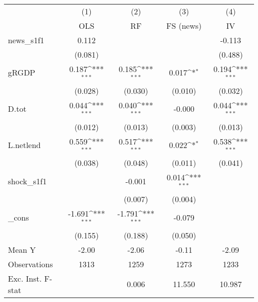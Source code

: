 {
\def\sym#1{\ifmmode^{#1}\else\(^{#1}\)\fi}
\begin{tabular}{l*{4}{c}}
\toprule
            &\multicolumn{1}{c}{(1)}&\multicolumn{1}{c}{(2)}&\multicolumn{1}{c}{(3)}&\multicolumn{1}{c}{(4)}\\
            &\multicolumn{1}{c}{OLS}&\multicolumn{1}{c}{RF}&\multicolumn{1}{c}{FS (news)}&\multicolumn{1}{c}{IV}\\
\midrule
news\_s1f1   &       0.112         &                     &                     &      -0.113         \\
            &     (0.081)         &                     &                     &     (0.488)         \\
\addlinespace
gRGDP       &       0.187\sym{***}&       0.185\sym{***}&       0.017\sym{*}  &       0.194\sym{***}\\
            &     (0.028)         &     (0.030)         &     (0.010)         &     (0.032)         \\
\addlinespace
D.tot       &       0.044\sym{***}&       0.040\sym{***}&      -0.000         &       0.044\sym{***}\\
            &     (0.012)         &     (0.013)         &     (0.003)         &     (0.013)         \\
\addlinespace
L.netlend   &       0.559\sym{***}&       0.517\sym{***}&       0.022\sym{*}  &       0.538\sym{***}\\
            &     (0.038)         &     (0.048)         &     (0.011)         &     (0.041)         \\
\addlinespace
shock\_s1f1  &                     &      -0.001         &       0.014\sym{***}&                     \\
            &                     &     (0.007)         &     (0.004)         &                     \\
\addlinespace
\_cons      &      -1.691\sym{***}&      -1.791\sym{***}&      -0.079         &                     \\
            &     (0.155)         &     (0.188)         &     (0.050)         &                     \\
\midrule
Mean Y      &       -2.00         &       -2.06         &       -0.11         &       -2.09         \\
Observations&        1313         &        1259         &        1273         &        1233         \\
Exc. Inst. F-stat&                     &       0.006         &      11.550         &      10.987         \\
\bottomrule
\end{tabular}
}
